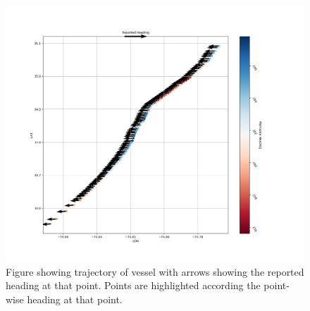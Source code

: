 \documentclass[bsc,frontabs,twoside,singlespacing,parskip,deptreport]{infthesis}     %
\begin{document}
\begin{figure}
    \centering
    \includegraphics[width=\linewidth]{report/images/badheadings.png}
    \caption{Figure showing trajectory of vessel with arrows showing the reported heading at that point. Points are highlighted according the point-wise heading at that point.}
    \label{fig:badfigures}
\end{figure}
\end{document}
